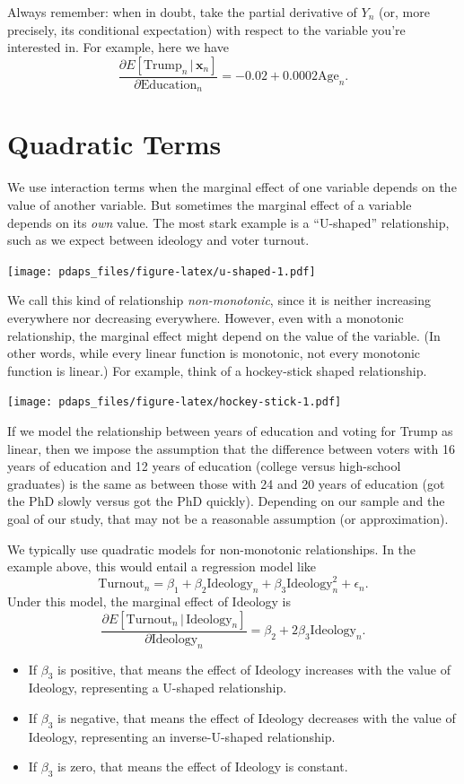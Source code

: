 \documentclass[
  12pt,
  oneside,openany]{book}
\begin{document}
Always remember: when in doubt, take the partial derivative of \(Y_n\) (or, more precisely, its conditional expectation) with respect to the variable you're interested in. For example, here we have
\[
\frac{\partial{}E[\text{Trump}_n \,|\, \mathbf{x}_n]}{\partial{}\text{Education}_n} = -0.02 + 0.0002 \text{Age}_n.
\]

\hypertarget{quadratic-terms}{%
\section{Quadratic Terms}\label{quadratic-terms}}

We use interaction terms when the marginal effect of one variable depends on the value of another variable. But sometimes the marginal effect of a variable depends on its \emph{own} value. The most stark example is a ``U-shaped'' relationship, such as we expect between ideology and voter turnout.

\texttt{[image: pdaps\_files/figure-latex/u-shaped-1.pdf]}

We call this kind of relationship \emph{non-monotonic}, since it is neither increasing everywhere nor decreasing everywhere. However, even with a monotonic relationship, the marginal effect might depend on the value of the variable. (In other words, while every linear function is monotonic, not every monotonic function is linear.) For example, think of a hockey-stick shaped relationship.

\texttt{[image: pdaps\_files/figure-latex/hockey-stick-1.pdf]}

If we model the relationship between years of education and voting for Trump as linear, then we impose the assumption that the difference between voters with 16 years of education and 12 years of education (college versus high-school graduates) is the same as between those with 24 and 20 years of education (got the PhD slowly versus got the PhD quickly). Depending on our sample and the goal of our study, that may not be a reasonable assumption (or approximation).

We typically use quadratic models for non-monotonic relationships. In the example above, this would entail a regression model like
\[
\text{Turnout}_n = \beta_1 + \beta_2 \text{Ideology}_n + \beta_3 \text{Ideology}_n^2 + \epsilon_n.
\]
Under this model, the marginal effect of Ideology is
\[
\frac{\partial{}E[\text{Turnout}_n \,|\, \text{Ideology}_n]}{\partial{}\text{Ideology}_n}
= \beta_2 + 2 \beta_3 \text{Ideology}_n.
\]

\begin{itemize}
\item
  If \(\beta_3\) is positive, that means the effect of Ideology increases with the value of Ideology, representing a U-shaped relationship.
\item
  If \(\beta_3\) is negative, that means the effect of Ideology decreases with the value of Ideology, representing an inverse-U-shaped relationship.
\item
  If \(\beta_3\) is zero, that means the effect of Ideology is constant.
\end{itemize}
\end{document}
